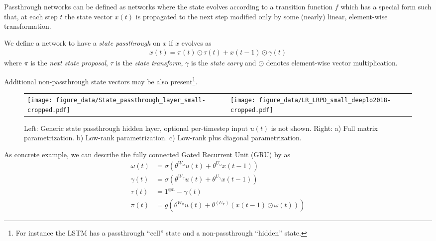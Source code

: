 \documentclass[11pt,a4paper]{article}
\begin{document}
Passthrough networks can be defined as networks where the state evolves according to a transition function $f$ which has a special form such that, at each step $t$ the state vector $x(t)$ is propagated to the next step modified only by some (nearly) linear, element-wise transformation.

We define a network to have a \textit{state passthrough} on $x$ if $x$ evolves as
\begin{equation}
\begin{multlined}
x(t) = \pi(t) \odot \tau(t) + x(t-1) \odot \gamma(t)
\end{multlined}
\end{equation}
where $\pi$ is the \textit{next state proposal}, $\tau$ is the \textit{state transform}, $\gamma$ is the \textit{state carry} and $\odot$ denotes  element-wise vector multiplication.

Additional non-passthrough state vectors may be also present\footnote{For instance the LSTM has a passthrough ``cell'' state and a non-passthrough ``hidden'' state.}.

\begin{figure*}
\setlength\tabcolsep{10.0pt}
\begin{tabular}{l|l}
\texttt{[image: figure\_data/State\_passthrough\_layer\_small-cropped.pdf]} 
&
\texttt{[image: figure\_data/LR\_LRPD\_small\_deeplo2018-cropped.pdf]} 
\end{tabular}
\caption{Left: Generic state passthrough hidden layer, optional per-timestep input $u(t)$ is not shown. Right: a) Full matrix parametrization. b) Low-rank parametrization. c) Low-rank plus diagonal parametrization.}
\label{FIG:PASSTRHOUGH_LRDPARAM}
\end{figure*}

As concrete example, we can describe the fully connected Gated Recurrent Unit (GRU) by  as
\begin{equation}
\begin{aligned}
\omega(t)    &= \sigma(\theta^{W_{\omega}} u(t) + \theta^{U_{\omega}} x(t-1)) \\
\gamma(t)      &= \sigma(\theta^{W_{\gamma}} u(t) + \theta^{U_{\gamma}} x(t-1)) \\
\tau(t) &=  1^{\otimes n} - \gamma(t) \\
\pi(t)    &= g(\theta^{W_{\pi}} u(t) + \theta^{(U_{\pi})} (x(t-1) \odot \omega(t))) 
\end{aligned}
\label{EQ:MODEL:PN:GRU}
\end{equation}
\end{document}
